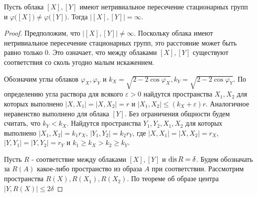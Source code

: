 \begin{theorem}
  Пусть облака $[X],[Y]$ имеют нетривиальное пересечение стационарных
  групп и $\varphi\big([X]\big)\neq \varphi\big([Y]\big)$. Тогда
  $\big|[X],[Y]\big| =\infty$.
\end{theorem}

\begin{proof}
  Предположим, что $ \big|[X],[Y]\big| \neq \infty $. Поскольку
  облака имеют нетривиальное пересечение стационарных групп, это
  расстояние может быть равно только $0$. Это означает, что между
  облаками $ [X], [Y] $ существуют соответствия со сколь угодно малым
  искажением.

  Обозначим углы облаков $ \varphi_X, \varphi_Y $ и $ k_X =
  \sqrt{2-2\cos \varphi_X},  k_Y = \sqrt{2-2\cos \varphi_Y} $. По
  определению угла раствора для всякого $ \varepsilon > 0 $ найдутся
  пространства $ X_1,X_2 $ для которых выполнено $ |X,X_1|=|X,X_2| =
  r $ и  $ |X_1,X_2|\le (k_X + \varepsilon) r $. Аналогичное
  неравенство выполнено для облака $[Y]$. Без ограничения общности
  будем считать, что $ k_Y < k_X $. Найдутся пространства $Y_1, Y_2,
  X_1, X_2$ для которых выполнено $|X_1,X_2| = k_1 r_X$, $|Y_1,Y_2| =
  k_2 r_Y$, где $ |X,X_1|=|X,X_2| = r_X $, $ |Y,Y_1|=|Y,Y_2| = r_Y $
  и $k_1 \ge k_X > k_2 \ge k_Y $.

  Пусть $ R $ - соответствие между облаками $ [X], [Y] $ и $ \operatorname{dis} R =
  \delta$. Будем обозначать за $ R(A) $ какое-либо пространство из
  образа $A$ при соответствии. Рассмотрим пространства $ R(X),
  R(X_1), R(X_2) $. По теореме об образе центра $ \big|Y,R(X)\big| \le 2\delta$
\end{proof}

